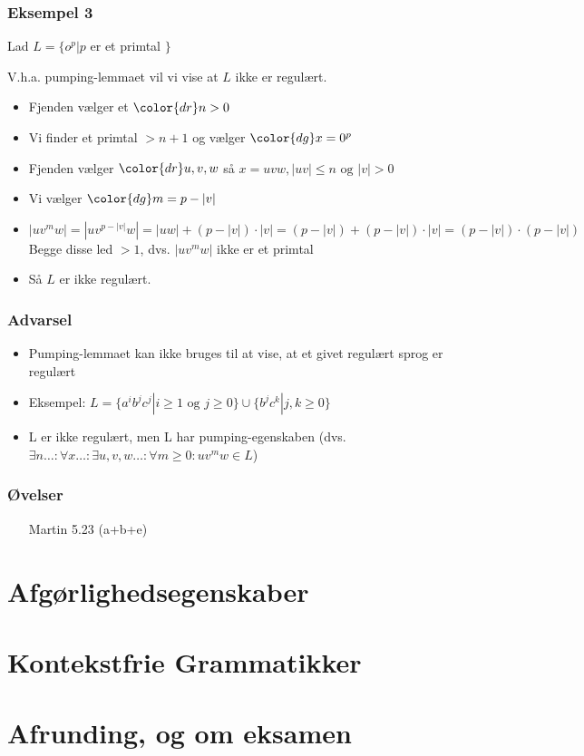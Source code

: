 \documentclass{beamer}
\begin{document}
\begin{frame}
\frametitle{Eksempel 3}
Lad $L = \{o^p | p $ er et primtal $ \}$

V.h.a. pumping-lemmaet vil vi vise at $L$ ikke er regulært.

\begin{itemize}[<+->]
\item Fjenden vælger et ${\color{dr}n}> 0$
\item Vi finder et primtal $>n+1$ og vælger ${\color{dg}x=0^p}$
\item Fjenden vælger ${\color{dr}u,v,w}$ så $x=uvw, |uv|\leq n \text{ og } |v| > 0$
\item Vi vælger ${\color{dg}m=p-|v|}$
\item $|uv^mw| = |uv^{p-|v|}w|=|uw|+(p-|v|)\cdot |v| = (p-|v|) + (p-|v|)\cdot |v|
  =(p-|v|)\cdot(p-|v|)$ Begge disse led $>1$, dvs. $|uv^mw|$ ikke er et primtal
\item Så $L$ er \alert{ikke} regulært.
\end{itemize}
\end{frame}

\begin{frame}
\frametitle{Advarsel}
\begin{itemize}[<+->]
\item  Pumping-lemmaet kan \alert{ikke} bruges til at vise, at  
et givet regulært sprog er regulært 
\item Eksempel: 
 $L = \{ a^ib^jc^j | i\geq 1\text{ og }j\geq 0 \} \cup \{ b^jc^k | j,k\geq 0 \}$
\item L er ikke regulært, men L har pumping-egenskaben
(dvs. $\exists n\ldots:  \forall x\ldots:  \exists u,v,w\ldots:  \forall m\geq 0: uv^mw \in L$)
\end{itemize}
\end{frame}
\begin{frame}
\frametitle{Øvelser}
\begin{itemize}
\item [Martin] 5.23 (a+b+e)
\end{itemize}
\end{frame}
\section{Afgørlighedsegenskaber}

\section{Kontekstfrie Grammatikker}
\section{Afrunding, og om eksamen}
\end{document}
